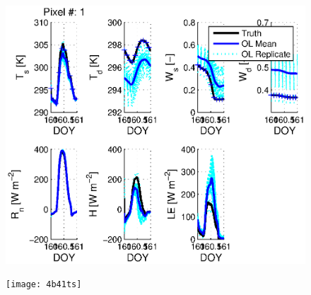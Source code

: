 \documentclass[letterpaper]{tufte-handout}
\begin{document}
\begin{figure}
  \includegraphics[width=\textwidth]{4b1ts}
\end{figure}
\begin{figure}
  \texttt{[image: 4b41ts]}
\end{figure}
\end{document}
